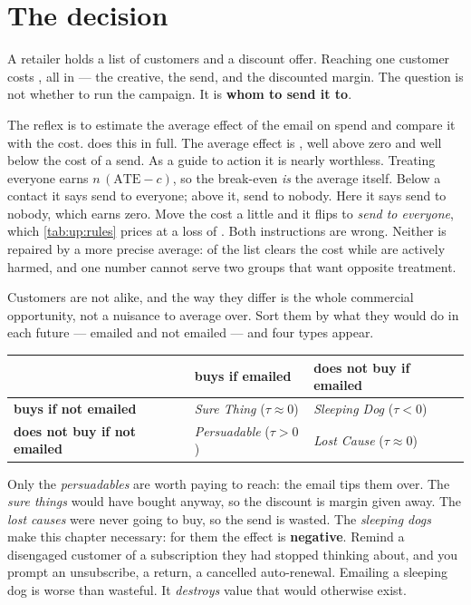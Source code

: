 \section{The decision}
\label{sec:up:decision}

A retailer holds a list of \nbOneNCustomers{} customers and a discount offer. Reaching one customer
costs \eur{\nbOneCost}, all in --- the creative, the send, and the discounted margin. The question is
not whether to run the campaign. It is \textbf{whom to send it to}.

The reflex is to estimate the average effect of the email on spend and compare it with the cost.
 does this in full. The average effect is \eur{\nbOneTrueAte}, well above zero
and well below the \eur{\nbOneCost} cost of a send. As a guide to action it is nearly worthless.
Treating everyone earns $n\,(\text{ATE} - c)$, so the break-even \emph{is} the average itself. Below
\eur{\nbOneTrueAte} a contact it says send to everyone; above it, send to nobody. Here it says send to
nobody, which earns zero. Move the cost a little and it flips to \emph{send to everyone}, which
\cref{tab:up:rules} prices at a loss of \eur{\nbOneTreatAllLoss}. Both instructions are wrong. Neither
is repaired by a more precise average: \pc{\nbOneShareProfitable} of the list clears the
\eur{\nbOneCost} cost while \pc{\nbOneShareSleeping} are actively harmed, and one number cannot serve
two groups that want opposite treatment.

Customers are not alike, and the way they differ is the whole commercial opportunity, not a nuisance
to average over. Sort them by what they would do in each future --- emailed and not emailed --- and
four types appear.

\begin{center}\small
\begin{tabular}{@{}lll@{}}
\toprule
 & \textbf{buys if emailed} & \textbf{does not buy if emailed} \\
\midrule
\textbf{buys if not emailed}
  & \emph{Sure Thing} ($\tau \approx 0$)
  & \emph{Sleeping Dog} ($\tau < 0$) \\
\textbf{does not buy if not emailed}
  & \emph{Persuadable} ($\tau > 0$)
  & \emph{Lost Cause} ($\tau \approx 0$) \\
\bottomrule
\end{tabular}
\end{center}

Only the \emph{persuadables} are worth paying to reach: the email tips them over. The \emph{sure
things} would have bought anyway, so the discount is margin given away. The \emph{lost causes} were
never going to buy, so the send is wasted. The \emph{sleeping dogs} make this chapter necessary: for
them the effect is \textbf{negative}. Remind a disengaged customer of a subscription they had stopped
thinking about, and you prompt an unsubscribe, a return, a cancelled auto-renewal. Emailing a sleeping
dog is worse than wasteful. It \emph{destroys} value that would otherwise exist.

